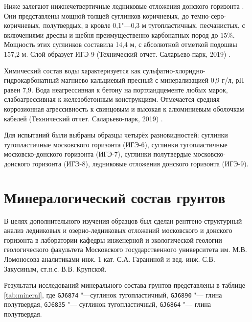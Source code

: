 Ниже залегают нижнечетвертичные ледниковые отложения донского горизонта . Они представлены мощной толщей суглинков коричневых, до темно-серо-коричневых, полутвердых, в кровле 0,1"---0,3 м тугопластичных, песчанистых, с включениями дресвы и щебня преимущественно карбонатных пород до 15\%. Мощность этих суглинков составила 14,4 м, с абсолютной отметкой подошвы 157,2 м. Слой образует ИГЭ-9 (Технический отчет. Саларьево-парк, 2019) \cite{moshkin2019}.

Химический состав воды характеризуется как сульфатно-хлоридно-гидрокарбонатный магниево-кальциевый пресный с минерализацией 0,9 г/л, рН равен 7,9. Вода неагрессивная к бетону на портландцементе любых марок, слабоагрессивная к железобетонным конструкциям. Отмечается средняя коррозионная агрессивность к свинцовым и высокая к алюминиевым оболочкам кабелей (Технический отчет. Саларьево-парк, 2019) \cite{moshkin2019}.


Для испытаний были выбраны образцы четырёх разновидностей: суглинки тугопластичные московского горизонта (ИГЭ-6), суглинки тугопластичные московско-донского горизонта (ИГЭ-7), суглинки полутвердые московско-донского горизонта (ИГЭ-8), ледниковые отложения донского горизонта (ИГЭ-9). 




 \section{Минералогический состав грунтов} 

В целях дополнительного изучения образцов был сделан рентгено-структурный анализ ледниковых и озерно-ледниковых отложений московского и донского горизонта в лаборатории кафедры инженерной и экологической геологии геологического факультета Московского государственного университета им. М.В. Ломоносова аналитиками инж. 1 кат. С.А. Гараниной и вед. инж. С.В. Закусиным, ст.н.с. В.В. Крупской.


Результаты исследований минерального состава грунтов представлены в таблице \ref{tab:mineral}, где \texttt{GJ6874} "---суглинок тугопластичный, \texttt{GJ6890} "--- глина полутвердая, \texttt{GJ6835} "--- суглинок тугопластичный, \texttt{GJ6864} "--- глина полутвердая.



